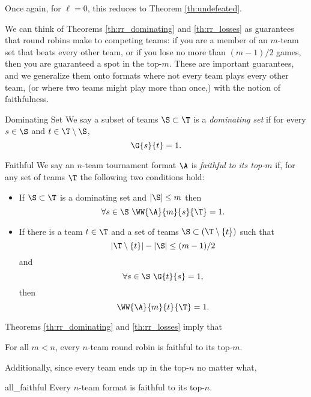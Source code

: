 {    Once again, for $\ell = 0$, this reduces to Theorem \ref{th:undefeated}.

    We can think of Theorems \ref{th:rr_dominating} and \ref{th:rr_losses} as guarantees that round robins make to competing teams: if you are a member of an $m$-team set that beats every other team, or if you lose no more than $(m-1)/2$ games, then you are guaranteed a spot in the top-$m$. These are important guarantees, and we generalize them onto formats where not every team plays every other team, (or where two teams might play more than once,) with the notion of faithfulness.

    \begin{definition}{Dominating Set}{}
        We say a subset of teams $\S \subset \T$ is a \textit{dominating set} if for every $s \in \S$ and $t \in \T \setminus \S$, $$\G{s}{t} = 1.$$
    \end{definition}
    

    \begin{definition}{Faithful}{}
        We say an $n$-team tournament format $\A$ is \textit{faithful to its top-$m$} if, for any set of teams $\T$ the following two conditions hold:
        \begin{itemize}
            \item If $\S \subset \T$ is a dominating set and $|\S| \leq m$ then $$\forall s \in \S \ \WW{\A}{m}{s}{\T} = 1.$$
            \item If there is a team $t \in \T$ and a set of teams $\S \subset (\T \setminus \{t\})$ such that $$|\T \setminus \{t\}| - |\S| \leq (m-1)/2$$ and $$\forall s \in \S \ \G{t}{s} = 1,$$ then $$\WW{\A}{m}{t}{\T} = 1.$$
        \end{itemize}
    \end{definition}

    Theorems \ref{th:rr_dominating} and \ref{th:rr_losses} imply that

    \begin{corollary}{}{}
        For all $m < n$, every $n$-team round robin is faithful to its top-$m$.
    \end{corollary}

    Additionally, since every team ends up in the top-$n$ no matter what,

    \begin{theorem}{}{all_faithful}
        Every $n$-team format is faithful to its top-$n.$
    \end{theorem}

}
